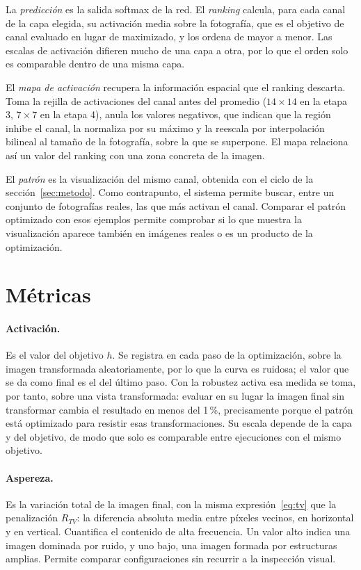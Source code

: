 \documentclass[11pt,a4paper]{article}
\begin{document}
La \emph{predicción} es la salida softmax de la red. El \emph{ranking}
calcula, para cada canal de la capa elegida, su activación media sobre la
fotografía, que es el objetivo de canal evaluado en lugar de maximizado, y
los ordena de mayor a menor. Las escalas de activación difieren mucho de una
capa a otra, por lo que el orden solo es comparable dentro de una misma
capa.

El \emph{mapa de activación} recupera la información espacial que el
ranking descarta. Toma la rejilla de activaciones del canal antes del
promedio ($14 \times 14$ en la etapa 3, $7 \times 7$ en la etapa 4), anula los
valores negativos, que indican que la región inhibe el canal, la normaliza
por su máximo y la reescala por interpolación bilineal al tamaño de la
fotografía, sobre la que se superpone. El mapa relaciona así un valor del
ranking con una zona concreta de la imagen.

El \emph{patrón} es la visualización del mismo canal, obtenida con el ciclo
de la sección~\ref{sec:metodo}. Como contrapunto, el sistema permite
buscar, entre un conjunto de fotografías reales, las que más activan el
canal. Comparar el patrón optimizado con esos ejemplos permite
comprobar si lo que muestra la visualización aparece también en imágenes
reales o es un producto de la optimización.

\section{Métricas}
\label{sec:metricas}

\paragraph{Activación.} Es el valor del objetivo $h$. Se registra en cada
paso de la optimización, sobre la imagen transformada aleatoriamente, por lo
que la curva es ruidosa; el valor que se da como final es el del último
paso. Con la robustez activa esa medida se toma, por tanto, sobre una vista
transformada: evaluar en su lugar la imagen final sin transformar cambia el
resultado en menos del 1\,\%, precisamente porque el patrón está optimizado
para resistir esas transformaciones. Su escala depende de la capa y del
objetivo, de modo que solo es comparable entre ejecuciones con el mismo
objetivo.

\paragraph{Aspereza.} Es la variación total de la imagen final, con la
misma expresión~\eqref{eq:tv} que la penalización $R_{TV}$: la diferencia
absoluta media entre píxeles vecinos, en horizontal y en vertical. Cuantifica
el contenido de alta frecuencia. Un valor alto indica una imagen dominada
por ruido, y uno bajo, una imagen formada por estructuras amplias. Permite
comparar configuraciones sin recurrir a la inspección visual.
\end{document}
